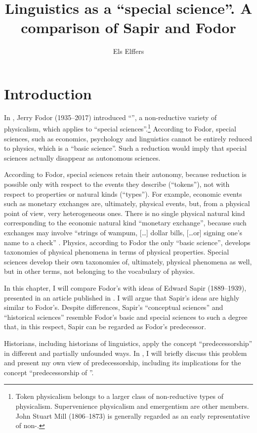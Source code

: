 \documentclass[output=paper]{langscibook}
\author{Els Elffers}
\title{Linguistics as a ``special science''. A comparison of Sapir and Fodor}
\begin{document}
\maketitle

\section{Introduction} 
\label{sec:elffers:intro}
In \citeyear{Fodor1974}, Jerry Fodor (1935--2017) introduced ``'', a non-reductive variety of physicalism, which applies to ``special sciences''.\footnote{Token physicalism belongs to a larger class of non-reductive types of physicalism. Supervenience physicalism and emergentism are other members. John Stuart Mill (1806--1873) is generally regarded as an early representative of non-.} According to Fodor, special sciences, such as economics, psychology and linguistics cannot be entirely reduced to physics, which is a ``basic science''. Such a reduction would imply that special sciences actually disappear as autonomous sciences. 

According to Fodor, special sciences retain their autonomy, because reduction is possible only with respect to the events they describe (``tokens''), not with respect to properties or natural kinds (``types''). For example, economic events such as monetary exchanges are, ultimately, physical events, but, from a physical point of view, very heterogeneous ones. There is no single physical natural kind corresponding to the economic natural kind ``monetary exchange'', because such exchanges may involve ``strings of wampum, […] dollar bills, […or] signing one's name to a check'' \citep[103]{Fodor1974}. Physics, according to Fodor the only ``basic science'', develops taxonomies of physical phenomena in terms of physical properties. Special sciences develop their own taxonomies of, ultimately, physical phenomena as well, but in other terms, not belonging to the vocabulary of physics.

In this chapter, I will compare Fodor's  with ideas of Edward Sapir (1889--1939), presented in an article published in \citeyear{Sapir1917}. I will argue that Sapir's ideas are highly similar to Fodor's. Despite differences, Sapir's ``conceptual sciences'' and ``historical sciences'' resemble Fodor's basic and special sciences to such a degree that, in this respect, Sapir can be regarded as Fodor's predecessor.

Historians, including historians of linguistics, apply the concept ``predecessorship'' in different and partially unfounded ways. In , I will briefly discuss this problem and present my own view of predecessorship, including its implications for the concept ``predecessorship of ''.
\end{document}
